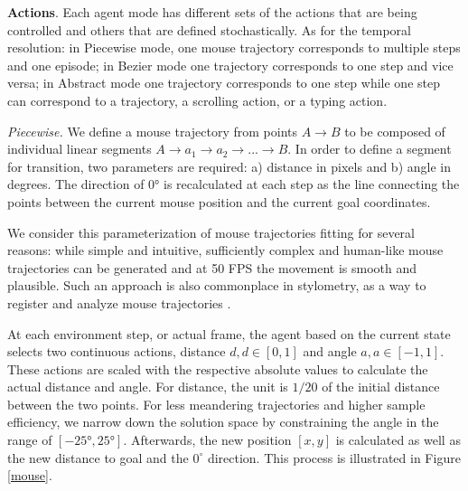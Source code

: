 \textbf{Actions}. Each agent mode has different sets of the actions that are being controlled and others that are defined stochastically.
As for the temporal resolution: in Piecewise mode, one mouse trajectory corresponds to multiple steps and one episode; in Bezier mode one trajectory corresponds to one step and vice versa; in Abstract mode one trajectory corresponds to one step while one step can correspond to a trajectory, a scrolling action, or a typing action.

\emph{Piecewise.} We define a mouse trajectory from points $A \rightarrow B$ to be composed of individual linear segments $A \rightarrow a_1 \rightarrow a_2 \rightarrow ... \rightarrow B$.
In order to define a segment for transition, two parameters are required: a) distance in pixels and b) angle in degrees. The direction of \ang{0} is recalculated at each step as the line connecting the points between the current mouse position and the current goal coordinates.

We consider this parameterization of mouse trajectories fitting for several reasons: while simple and intuitive, sufficiently complex and human-like mouse trajectories can be generated and at 50 FPS the movement is smooth and plausible.
Such an approach is also commonplace in stylometry, as a way to register and analyze mouse trajectories \cite{fridman2015multi}.

At each environment step, or actual frame, the agent based on the current state selects two continuous actions, distance $d, d \in [0,1]$ and angle $a, a \in [-1,1]$.
These actions are scaled with the respective absolute values to calculate the actual distance and angle.
For distance, the unit is $1/20$ of the initial distance between the two points.
For less meandering trajectories and higher sample efficiency, we narrow down the solution space by constraining the angle in the range of $[\ang{-25}, \ang{25}]$.
Afterwards, the new position $[x,y]$ is calculated as well as the new distance to goal and the $0^{\circ}$ direction.
This process is illustrated in Figure \ref{mouse}.

